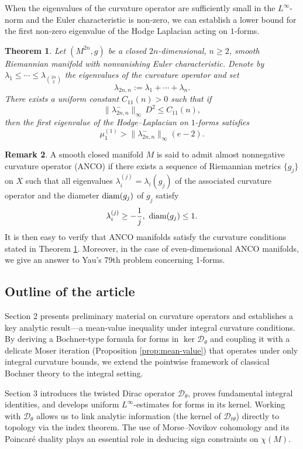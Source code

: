 \documentclass[12pt, twoside]{article}
\newtheorem{theorem}{Theorem}[section]
\theoremstyle{definition}
\newtheorem{remark}[theorem]{Remark}
\numberwithin{equation}{section}
\def \la {\lambda}
\begin{document}
When the eigenvalues of the curvature operator are sufficiently small in the $L^{\infty}$-norm and the Euler characteristic is non‑zero, we can establish a lower bound for the first non‑zero eigenvalue of the Hodge Laplacian acting on  $1$‑forms.
\begin{theorem}\label{thm:eigenvalue-Hodge-Laplacian}
	Let $(M^{2n},g)$ be a closed $2n$-dimensional, $n\ge 2$, smooth Riemannian manifold with nonvanishing Euler characteristic. Denote by $\lambda_1\le\cdots\le\lambda_{\binom{2n}{2}}$ the eigenvalues of the curvature operator and set
	\[
	\lambda_{2n,n} :=\lambda_1+\cdots+\lambda_n .
	\]
	There exists a uniform constant $C_{11}(n)>0$ such that if
	\[
	\|\lambda_{2n,n}^{-}\|_{\infty}\, D^{2}\le C_{11}(n),
	\]
	then the first eigenvalue of the Hodge–Laplacian on $1$-forms satisfies
	\[
	\mu_{1}^{(1)}
	> \|\lambda^{-}_{2n,n}\|_{\infty}(e-2).
	\]
\end{theorem}
\begin{remark}
A smooth closed  manifold $M$ is said to admit almost nonnegative curvature operator (ANCO) if there exists a sequence of Riemannian metrics $\{g_{j}\}$ on $X$ such that all eigenvalues
	$\la^{(j)}_{i}=\la_{i}(g_{j})$ of the associated curvature operator and the diameter ${\rm{diam}}(g_{j})$ of $g_{j}$ satisfy
	$$\la^{(j)}_{i}\geq -\frac{1}{j},\ {\rm{diam}}(g_{j})\leq 1.$$
It is then easy to verify that ANCO manifolds satisfy the curvature conditions stated in Theorem \ref{thm:eigenvalue-Hodge-Laplacian}. Moreover,  in the case of even-dimensional ANCO manifolds, we give an answer to Yau’s 79th problem concerning 1‑forms.
\end{remark}




\subsection*{Outline of the article}
Section 2 presents preliminary material on curvature operators and establishes a key analytic result---a mean-value inequality under integral curvature conditions. By deriving a Bochner-type formula for forms in \(\ker\mathcal{D}_{\theta}\) and coupling it with a delicate Moser iteration (Proposition \ref{prop:mean-value}) that operates under only integral curvature bounds, we extend the pointwise framework of classical Bochner theory to the integral setting.  

Section 3 introduces the twisted Dirac operator \(\mathcal{D}_{\theta}\), proves fundamental integral identities, and develops uniform \(L^{\infty}\)-estimates for forms in its kernel. Working with \(\mathcal{D}_{\theta}\) allows us to link analytic information (the kernel of \(\mathcal{D}_{t\theta}\)) directly to topology via the index theorem. The use of Morse--Novikov cohomology and its Poincar\'e duality \cite{Novikov1982} plays an essential role in deducing sign constraints on \(\chi(M)\).  
\end{document}

